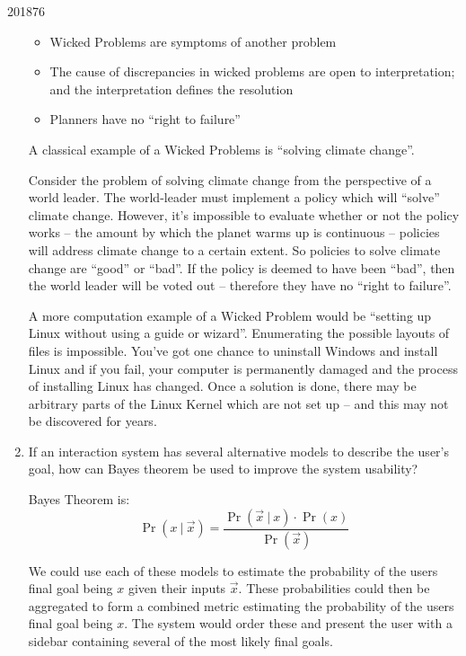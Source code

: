 \documentclass[10pt,\jkfside,a4paper]{article}
\begin{document}
\begin{examquestion}{2018}{7}{6}
\begin{enumerate}
\begin{itemize}
\item Wicked Problems are symptoms of another problem

\item The cause of discrepancies in wicked problems are open to
interpretation; and the interpretation defines the resolution

\item Planners have no ``right to failure''

\end{itemize}

A classical example of a Wicked Problems is ``solving climate change''.

Consider the problem of solving climate change from the perspective of a
world leader. The world-leader must implement a policy which will ``solve''
climate change. However, it's impossible to evaluate whether or not the
policy works -- the amount by which the planet warms up is continuous --
policies will address climate change to a certain extent. So policies to
solve climate change are ``good'' or ``bad''. If the policy is deemed to
have been ``bad'', then the world leader will be voted out -- therefore they
 have no ``right to failure''.

A more computation example of a Wicked Problem would be ``setting up Linux
without using a guide or wizard''. Enumerating the possible layouts of
files is impossible. You've got one chance to uninstall Windows and install
Linux and if you fail, your computer is permanently damaged and the process
of installing Linux has changed. Once a solution is done, there may be
arbitrary parts of the Linux Kernel which are not set up -- and this may not
be discovered for years.

\item If an interaction system has several alternative models to describe
the user's goal, how can Bayes theorem be used to improve the system usability?

Bayes Theorem is:
\[
\Pr(x\ |\ \overrightarrow{x}) = \frac{\Pr(\overrightarrow{x}\ |\ x) \cdot
\Pr(x)}{\Pr(\overrightarrow{x})}
\]

We could use each of these models to estimate the probability of the users
final goal being $x$ given their inputs $\overrightarrow{x}$. These
probabilities could then be aggregated to form a combined metric estimating
the probability of the users final goal being $x$. The system would order
these and present the user with a sidebar containing several of the most
likely final goals.


\end{enumerate}
\end{examquestion}
\end{document}

